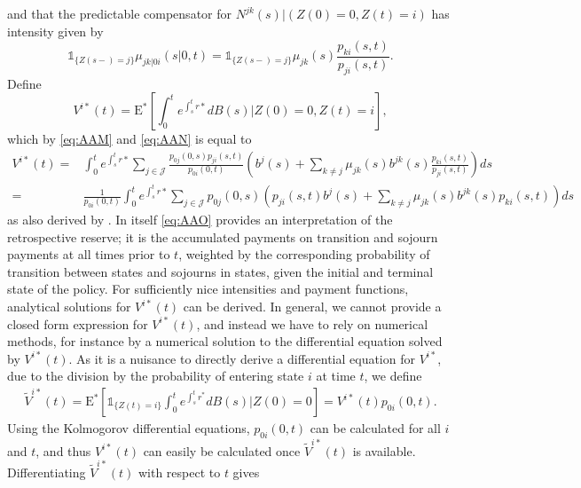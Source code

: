 \documentclass[12pt]{article}
\newcommand{\E}{\text{E}}
\newcommand{\indic}[1]{\mathds{1}_{ \{ #1 \} }}
\theoremstyle{my_thm}
\begin{document}
and that the predictable compensator for $N^{jk}(s)| (Z(0)=0, Z(t)=i )$ has intensity given by
\begin{equation}
\indic{Z(s-)=j}\mu_{jk|0i}(s|0,t)=\indic{Z(s-)=j}\mu_{jk}(s)\frac{p_{ki}(s,t)}{p_{ji}(s,t)}. \label{eq:AAN}
\end{equation}
Define
$$
V^{i*}(t)= \E^* \left[ \int_0^t e^{\int_s^t r*} dB(s) \big|Z(0)=0, Z(t)=i \right],
$$
which by \eqref{eq:AAM} and \eqref{eq:AAN} is equal to
\begin{align}
V^{i*}(t)=& \int_0^t e^{\int_s^t r*} \sum_{j \in \mathcal{J}} \frac{p_{0j}(0,s)p_{ji}(s,t)}{p_{0i}(0,t)} \left(  b^{j}(s) + \sum_{k \neq j}  \mu_{jk}(s) b^{jk}(s)\frac{p_{ki}(s,t)}{p_{ji}(s,t)} \right) ds
 \nonumber \\
=&
 \frac{1}{p_{0i}(0,t)}\int_0^t e^{\int_s^t r*} \sum_{j \in \mathcal{J}} p_{0j}(0,s) \left(p_{ji}(s,t)   b^{j}(s) + \sum_{k \neq j}  \mu_{jk}(s) b^{jk}(s) p_{ki}(s,t) \right) ds \label{eq:AAO}
\end{align}
as also derived by \citet{Norberg}. In itself \eqref{eq:AAO} provides an interpretation of the retrospective reserve; it is the accumulated payments on transition and sojourn payments at all times prior to $t$, weighted by the corresponding probability of transition between states and sojourns in states, given the initial and terminal state of the policy. For sufficiently nice intensities and payment functions, analytical solutions for $V^{i*}(t)$ can be derived. In general, we cannot provide a closed form expression for $V^{i*}(t)$, and instead we have to rely on numerical methods, for instance by a numerical solution to the differential equation solved by $V^{i*}(t)$. As it is a nuisance to directly derive a differential equation for $V^{i*}$, due to the division by the probability of entering state $i$ at time $t$, we define
\begin{align*}
\tilde{V}^{i*}(t)= \E^* \left[ \indic{Z(t)=i} \int_0^t e^{\int_s^t r^*} dB(s) \big|Z(0)=0\right] = V^{i*}(t)p_{0i}(0,t).
\end{align*}
Using the Kolmogorov differential equations, $p_{0i}(0,t)$ can be calculated for all $i$ and $t$, and thus $V^{i*}(t)$ can easily be calculated once $\tilde{V}^{i*}(t)$ is available. Differentiating $\tilde{V}^{i*}(t)$ with respect to $t$ gives
\end{document}

